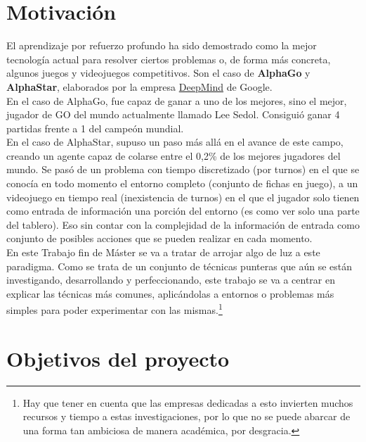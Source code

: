 \documentclass[11pt,fleqn]{book} %
\begin{document}
\section{Motivación}\label{sec:DRL2}

El aprendizaje por refuerzo profundo ha sido demostrado como la mejor tecnología actual para resolver ciertos problemas o, de forma más concreta, algunos juegos y videojuegos competitivos. Son el caso de \textbf{AlphaGo} y \textbf{AlphaStar}, elaborados por la empresa \href{https://deepmind.com/}{DeepMind} de Google.\cite{article:DeepMind} \\

En el caso de AlphaGo, fue capaz de ganar a uno de los mejores, sino el mejor, jugador de GO del mundo actualmente llamado Lee Sedol. Consiguió ganar 4 partidas frente a 1 del campeón mundial.\cite{article:leesedol} \cite{article:leesedol2} \\

En el caso de AlphaStar, supuso un paso más allá en el avance de este campo, creando un agente capaz de colarse entre el 0,2\% de los mejores jugadores del mundo. Se pasó de un problema con tiempo discretizado (por turnos) en el que se conocía en todo momento el entorno completo (conjunto de fichas en juego), a un videojuego en tiempo real (inexistencia de turnos) en el que el jugador solo tienen como entrada de información una porción del entorno (es como ver solo una parte del tablero). Eso sin contar con la complejidad de la información de entrada como conjunto de posibles acciones que se pueden realizar en cada momento.\cite{article:vinyals} \cite{article:vinyals2} \\

En este Trabajo fin de Máster se va a tratar de arrojar algo de luz a este paradigma. Como se trata de un conjunto de técnicas punteras que aún se están investigando, desarrollando y perfeccionando, este trabajo se va a centrar en explicar las técnicas más comunes, aplicándolas a entornos o problemas más simples para poder experimentar con las mismas.\footnote{Hay que tener en cuenta que las empresas dedicadas a esto invierten muchos recursos y tiempo a estas investigaciones, por lo que no se puede abarcar de una forma tan ambiciosa de manera académica, por desgracia.} \\

\section{Objetivos del proyecto}\label{sec:objetivos}
\end{document}
